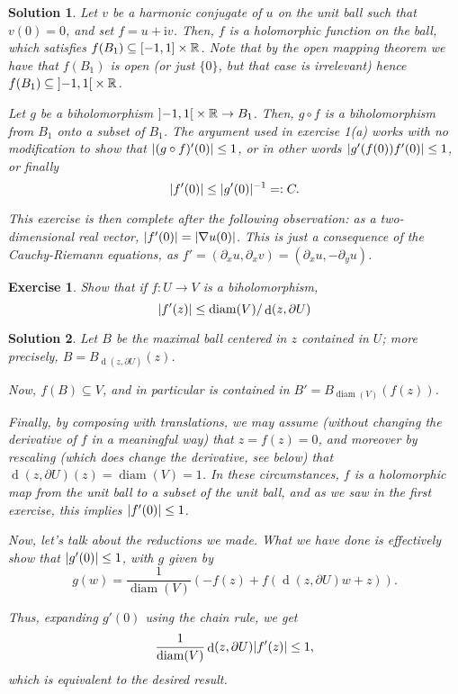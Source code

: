 \documentclass{article}
\newtheorem{ex}{Exercise}
\theoremstyle{nonumberplain}
\newtheorem{sol}{Solution}
\newcommand{\R}{\mathbb{R}}
\newcommand{\I}{\mathrm{i}}
\DeclareMathOperator{\diam}{diam}
\DeclareMathOperator{\dist}{d}
\DeclarePairedDelimiter{\abs}{\lvert}{\rvert}
\begin{document}
\begin{sol}
Let $v$ be a harmonic conjugate of $u$ on the unit ball such that $v(0) = 0$, and set $f = u + \I v$. Then, $f$ is a holomorphic function on the ball, which satisfies $f(B_1) \subseteq \interval{-1}1 \times \R$. Note that by the open mapping theorem we have that $f(B_1)$ is open (or just $\{0\}$, but that case is irrelevant) hence $f(B_1) \subseteq \ointerval{-1}1 \times \R$.

Let $g$ be a biholomorphism $\ointerval{-1}1 \times \R \to B_1$. Then, $g \circ f$ is a biholomorphism from $B_1$ onto a subset of $B_1$. The argument used in exercise 1(a) works with no modification to show that $\abs{(g \circ f)'(0)} \leq 1$, or in other words $\abs{g'(f(0)) f'(0)} \leq 1$, or finally
\begin{equation}
\abs{f'(0)} \leq \abs{g'(0)}^{-1} =: C.
\end{equation}

This exercise is then complete after the following observation: as a two-dimensional real vector, $\abs{f'(0)} = \abs{\nabla u(0)}$. This is just a consequence of the Cauchy-Riemann equations, as $f' = (\partial_x u, \partial_x v) = (\partial_x u, - \partial_y u)$.
\end{sol}

\begin{ex}
Show that if $f \colon U \to V$ is a biholomorphism,
\begin{equation}
\abs{f'(z)} \leq \diam(V)/\dist(z,\partial U)
\end{equation}
\end{ex}

\begin{sol}
Let $B$ be the maximal ball centered in $z$ contained in $U$; more precisely, $B = B_{\dist(z,\partial U)}(z)$.

Now, $f(B) \subseteq V$, and in particular is contained in $B' = B_{\diam(V)}(f(z))$.

Finally, by composing with translations, we may assume (without changing the derivative of $f$ in a meaningful way) that $z = f(z) = 0$, and moreover by rescaling (which does change the derivative, see below) that $\dist(z,\partial U)(z) = \diam(V) = 1$. In these circumstances, $f$ is a holomorphic map from the unit ball to a subset of the unit ball, and as we saw in the first exercise, this implies $\abs{f'(0)} \leq 1$.

Now, let's talk about the reductions we made. What we have done is effectively show that $\abs{g'(0)} \leq 1$, with $g$ given by
\begin{equation}
g(w) = \frac1{\diam(V)} \left( -f(z) + f(\dist(z, \partial U) w + z) \right).
\end{equation}

Thus, expanding $g'(0)$ using the chain rule, we get
\begin{equation}
\frac1{\diam(V)} \dist(z,\partial U) \abs{f'(z)} \leq 1,
\end{equation}
which is equivalent to the desired result.
\end{sol}
\end{document}
